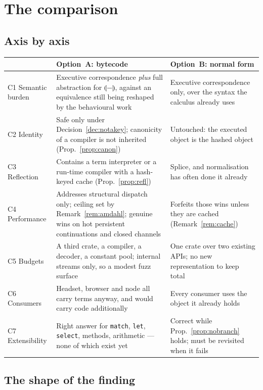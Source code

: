 \documentclass[11pt,a4paper]{article}
\newcommand{\code}[1]{\texttt{#1}}
\newcommand{\cmp}[1]{\llparenthesis #1 \rrparenthesis}
\theoremstyle{definition}
\theoremstyle{plain}
\begin{document}
\section{The comparison}\label{sec:cmp}

\subsection{Axis by axis}

\begin{center}
\begin{tabularx}{\linewidth}{@{}l>{\raggedright\arraybackslash}X>{\raggedright\arraybackslash}X@{}}
\toprule
& Option~A: bytecode & Option~B: normal form\\
\midrule
C1 Semantic burden & Executive correspondence \emph{plus} full abstraction for
$\cmp{-}$, against an equivalence still being reshaped by the behavioural work &
Executive correspondence only, over the syntax the calculus already uses\\
C2 Identity & Safe only under Decision~\ref{dec:notakey}; canonicity of a
compiler is not inherited (Prop.~\ref{prop:canon}) & Untouched: the executed
object is the hashed object\\
C3 Reflection & Contains a term interpreter or a run-time compiler with a
hash-keyed cache (Prop.~\ref{prop:refl}) & Splice, and normalisation has often
done it already\\
C4 Performance & Addresses structural dispatch only; ceiling set by
Remark~\ref{rem:amdahl}; genuine wins on hot persistent continuations and closed
channels & Forfeits those wins unless they are cached
(Remark~\ref{rem:cache})\\
C5 Budgets & A third crate, a compiler, a decoder, a constant pool; internal
streams only, so a modest fuzz surface & One crate over two existing APIs; no
new representation to keep total\\
C6 Consumers & Headset, browser and node all carry terms anyway, and would carry
code additionally & Every consumer uses the object it already holds\\
C7 Extensibility & Right answer for \code{match}, \code{let}, \code{select},
methods, arithmetic --- none of which exist yet & Correct while
Prop.~\ref{prop:nobranch} holds; must be revisited when it fails\\
\bottomrule
\end{tabularx}
\end{center}

\subsection{The shape of the finding}
\end{document}
